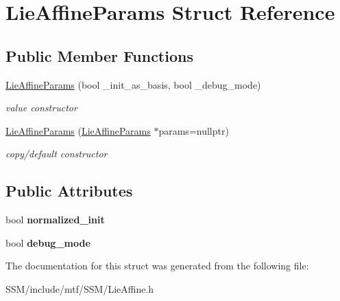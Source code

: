 \hypertarget{structLieAffineParams}{\section{Lie\-Affine\-Params Struct Reference}
\label{structLieAffineParams}
}
\subsection*{Public Member Functions}
\begin{DoxyCompactItemize}
\item 
\hypertarget{structLieAffineParams_a277011f38bc1cfe72b5b0c300c7e0932}{\hyperlink{structLieAffineParams_a277011f38bc1cfe72b5b0c300c7e0932}{Lie\-Affine\-Params} (bool \-\_\-init\-\_\-as\-\_\-basis, bool \-\_\-debug\-\_\-mode)}\label{structLieAffineParams_a277011f38bc1cfe72b5b0c300c7e0932}

\begin{DoxyCompactList}\small\item\em value constructor \end{DoxyCompactList}\item 
\hypertarget{structLieAffineParams_aefc94b1c35befae2da3e15d87399b544}{\hyperlink{structLieAffineParams_aefc94b1c35befae2da3e15d87399b544}{Lie\-Affine\-Params} (\hyperlink{structLieAffineParams}{Lie\-Affine\-Params} $\ast$params=nullptr)}\label{structLieAffineParams_aefc94b1c35befae2da3e15d87399b544}

\begin{DoxyCompactList}\small\item\em copy/default constructor \end{DoxyCompactList}\end{DoxyCompactItemize}
\subsection*{Public Attributes}
\begin{DoxyCompactItemize}
\item 
\hypertarget{structLieAffineParams_a3dd15b6f27bd705c9f7be4b8897c3014}{bool {\bfseries normalized\-\_\-init}}\label{structLieAffineParams_a3dd15b6f27bd705c9f7be4b8897c3014}

\item 
\hypertarget{structLieAffineParams_a89378199aab1b6356edfe609e45a1c67}{bool {\bfseries debug\-\_\-mode}}\label{structLieAffineParams_a89378199aab1b6356edfe609e45a1c67}

\end{DoxyCompactItemize}


The documentation for this struct was generated from the following file\-:\begin{DoxyCompactItemize}
\item 
S\-S\-M/include/mtf/\-S\-S\-M/Lie\-Affine.\-h\end{DoxyCompactItemize}
